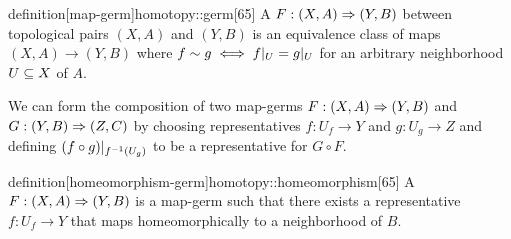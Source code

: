 \begin{mystatement}{definition}[map-germ]{homotopy::germ}[65]
    A  $F: (X, A) \Rightarrow{} (Y, B)$
    between topological pairs $(X, A)$ and $(Y, B)$
    is an equivalence class of maps $(X, A) \to (Y, B)$
    where $f \sim g \iff f\vert_{U} = g\vert_{U}$
    for an arbitrary neighborhood $U \subseteq{} X$ of $A$. 
\end{mystatement}

\begin{myparagraph}
    We can form the composition of two map-germs
    $F: (X, A) \Rightarrow{} (Y, B)$ and $G: (Y, B) \Rightarrow{} (Z, C)$
    by choosing representatives $f: U_f \to Y$ and $g: U_g \to Z$
    and defining $(f \circ g) \vert_{f^{-1}(U_g)}$ to be
    a representative for $G \circ F$.
\end{myparagraph}

\begin{mystatement}{definition}[homeomorphism-germ]{homotopy::homeomorphism}[65]
    A  $F: (X, A) \Rightarrow{} (Y, B)$ is a map-germ
    such that there exists a representative $f: U_f \to Y$
    that maps homeomorphically to a neighborhood of $B$.  
\end{mystatement}